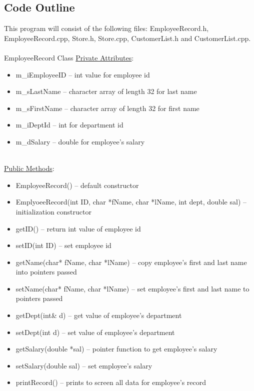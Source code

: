 \documentclass[12pt]{article}%
\begin{document}
\subsection{Code Outline}
This program will consist of the following files: EmployeeRecord.h, EmployeeRecord.cpp, Store.h, Store.cpp,
CustomerList.h and CustomerList.cpp.
\hfill\\
\hfill\\
EmployeeRecord Class
\underline{Private Attributes}:
\begin{itemize}
    \item m\_iEmployeeID -- int value for employee id
    \item m\_sLastName -- character array of length 32 for last name
    \item m\_sFirstName -- character array of length 32 for first name
    \item m\_iDeptId -- int for department id
    \item m\_dSalary -- double for employee's salary
    \end{itemize}
    \hfill\\
\underline{Public Methods}:
\begin{itemize}
    \item EmployeeRecord() -- default constructor
    \item EmplyoeeRecord(int ID, char *fName, char *lName, int dept, double sal) -- initialization constructor
    \item getID() -- return int value of employee id
    \item setID(int ID) -- set employee id
    \item getName(char* fName, char *lName) -- copy employee's first and last name into pointers passed
    \item setName(char* fName, char *lName) -- set employee's first and last name to pointers passed
    \item getDept(int\& d) -- get value of employee's department
    \item setDept(int d) -- set value of employee's department
    \item getSalary(double *sal) -- pointer function to get employee's salary
    \item setSalary(double sal) -- set employee's salary
    \item printRecord() -- prints to screen all data for employee's record
\end{itemize}
\hfill\\
\hfill\\
\end{document}
